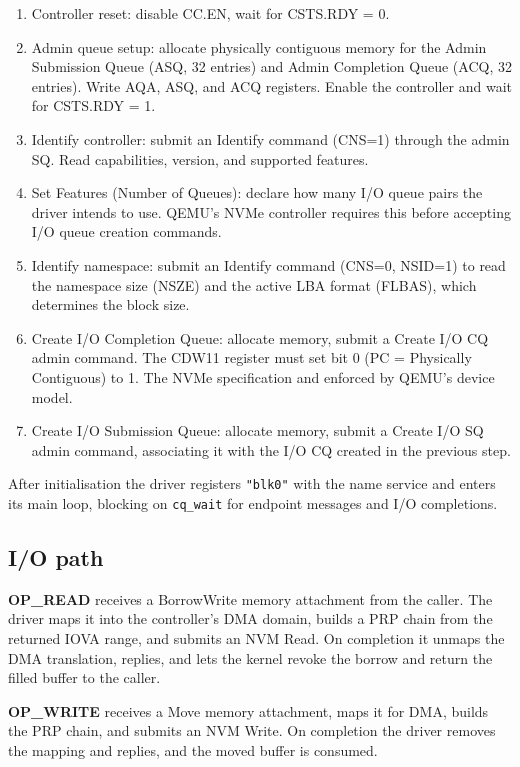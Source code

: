 \begin{enumerate}
    \item Controller reset: disable CC.EN, wait for CSTS.RDY = 0.
    \item Admin queue setup: allocate physically contiguous memory for the
        Admin Submission Queue (ASQ, 32 entries) and Admin Completion Queue
        (ACQ, 32 entries). Write AQA, ASQ, and ACQ registers. Enable the
        controller and wait for CSTS.RDY = 1.
    \item Identify controller: submit an Identify command (CNS=1) through
        the admin SQ. Read capabilities, version, and supported features.
    \item Set Features (Number of Queues): declare how many I/O queue
        pairs the driver intends to use. QEMU's NVMe controller requires this
        before accepting I/O queue creation commands.
    \item Identify namespace: submit an Identify command (CNS=0, NSID=1)
        to read the namespace size (NSZE) and the active LBA format (FLBAS),
        which determines the block size.
    \item Create I/O Completion Queue: allocate memory, submit a Create
        I/O CQ admin command. The CDW11 register must set bit 0 (PC =
        Physically Contiguous) to 1. The NVMe
        specification and enforced by QEMU's device model.
    \item Create I/O Submission Queue: allocate memory, submit a Create
        I/O SQ admin command, associating it with the I/O CQ created in the
        previous step.
\end{enumerate}

After initialisation the driver registers \texttt{"blk0"} with the name service
and enters its main loop, blocking on \texttt{cq\_wait} for endpoint messages
and I/O completions.

\subsection{I/O path}

\textbf{OP\_READ} receives a BorrowWrite memory attachment from the caller. The
driver maps it into the controller's DMA domain, builds a PRP chain from the
returned IOVA range, and submits an NVM Read. On completion it unmaps the DMA
translation, replies, and lets the kernel revoke the borrow and return the filled
buffer to the caller.

\textbf{OP\_WRITE} receives a Move memory attachment, maps it for DMA, builds the
PRP chain, and submits an NVM Write. On completion the driver removes the mapping
and replies, and the moved buffer is consumed.

